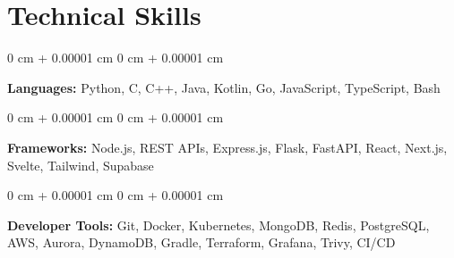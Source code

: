 \documentclass[10pt, letterpaper]{article}
\newenvironment{onecolentry}{
    \begin{adjustwidth}{
        0 cm + 0.00001 cm
    }{
        0 cm + 0.00001 cm
    }
}{
    \end{adjustwidth}
}
\begin{document}
    \vspace{0.10 cm}
    \section{Technical Skills}

    \begin{onecolentry}
        \textbf{Languages:} Python, C, C++, Java, Kotlin, Go, JavaScript, TypeScript, Bash
    \end{onecolentry}

    \vspace{0.1 cm}

    \begin{onecolentry}
        \textbf{Frameworks:} Node.js, REST APIs, Express.js, Flask, FastAPI, React, Next.js, Svelte, Tailwind, Supabase
    \end{onecolentry}

    \vspace{0.1 cm}

    \begin{onecolentry}
        \textbf{Developer Tools:} Git, Docker, Kubernetes, MongoDB, Redis, PostgreSQL, AWS, Aurora, DynamoDB, Gradle, Terraform, Grafana, Trivy, CI/CD
    \end{onecolentry}
\end{document}
